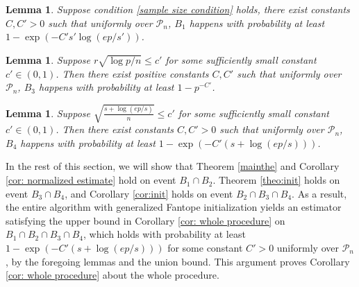 \documentclass[11pt]{article}
\newcommand{\nb}[1]{\textcolor{orange}{\texttt{[#1]}}}
\newcommand{\gsc}[1]{\textcolor{blue}{\texttt{[#1]}}}
\newcommand{\red}{\color{red}}
\newcommand{\cI}{{\mathcal{I}}}
\newcommand{\0}{{\mathbf{0}}}
\newtheorem{lemma}[theorem]{Lemma}
\begin{document}
\begin{lemma}\label{lemma: oracle}
{ Suppose condition \eqref{sample size condition} holds, there exist constants $C, C' > 0$ such that uniformly over $\mathcal{P}_n$,} 
$B_1$ happens with probability at least $1-\exp(-C's'\log(ep/s'))$.
\end{lemma}

\begin{lemma}\label{prob B3}
Suppose $r\sqrt{\log p/n}\leq c'$ for some sufficiently small constant $c'\in(0, 1)$. Then there exist positive constants $C, C'$
such that { uniformly over $\mathcal{P}_n$,} $B_3$ happens with probability at least $1-p^{-C'}$.
\end{lemma} 

\begin{lemma}\label{prob B4}
Suppose $\sqrt{\frac{s+\log(ep/s)}{n}}\leq c'$ for some sufficiently small constant $c'\in(0,1)$. Then { there exist constants $C, C'>0$ such that uniformly over $\mathcal{P}_n$,} $B_4$ happens with probability at least $1-\exp(-C'(s+\log(ep/s)))$. 
\end{lemma}


In the rest of this section, 
we will show that Theorem \ref{mainthe} and Corollary \ref{cor: normalized estimate} hold on event $B_1\cap B_2$. 
Theorem \ref{theo:init} holds on event $B_3\cap B_4$,
and Corollary \ref{cor:init} holds  on event $B_2 \cap B_3\cap B_4$.
As a result, the entire algorithm with generalized Fantope initialization yields an estimator satisfying the upper bound in { Corollary \ref{cor: whole procedure}} 
on $B_1\cap B_2\cap B_3\cap B_4$,
 which holds with probability { at least $1-\exp(-C'(s+\log(ep/s)))$ for some constant $C'>0$  uniformly over $\mathcal{P}_n$,} by the foregoing lemmas and the union bound. This argument proves Corollary  \ref{cor: whole procedure} about the whole procedure.
\end{document}
